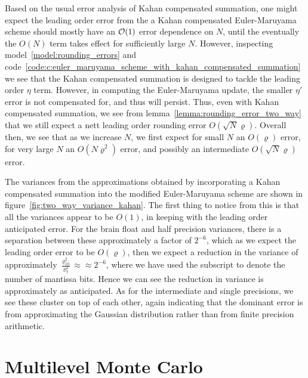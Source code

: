 \documentclass[manuscript,review]{acmart}
\begin{document}
Based on the usual error analysis of Kahan compensated summation, one might expect the leading order error from the a Kahan compensated Euler-Maruyama scheme should mostly have an $ \order{1} $ error dependence on $ N $, until the eventually the $ O(N) $ term takes effect for sufficiently large $ N $. However, inspecting model~\ref{model:rounding_errors} and code~\ref{code:c:euler_maruyama_scheme_with_kahan_compensated_summation} we see that the Kahan compensated summation is designed to tackle the leading order $ \eta $ term. However, in computing the Euler-Maruyama update, the smaller $ \eta' $ error is not compensated for, and thus will persist. Thus, even with Kahan compensated summation, we see from lemma~\ref{lemma:rounding_error_two_way} that we still expect a nett leading order rounding error $ O(\sqrt{N}\varrho) $. Overall then, we see that as we increase $ N $, we first expect for small $ N $ an $ O(\varrho) $ error, for very large $ N $ an $ O(N\varrho^2) $ error, and possibly an intermediate $ O(\sqrt{N}\varrho) $ error. 

The variances from the approximations obtained by incorporating a Kahan compensated summation into the modified Euler-Maruyama scheme are shown in figure~\ref{fig:two_way_variance_kahan}. The first thing to notice from this is that all the variances appear to be $ O(1) $, in keeping with the leading order anticipated error. For the brain float and half precision variances, there is a separation between these approximately a factor of $ 2^{-6} $, which as we expect the leading order error to be $ O(\varrho) $, then we expect a reduction in the variance of approximately $ \tfrac{\varrho^2_{10}}{\varrho^2_{7}} \approx \approx 2^{-6} $, where we have used the subscript to denote the number of mantissa bits. Hence we can see the reduction in variance is approximately as anticipated. As for the intermediate and single precisions, we see these cluster on top of each other, again indicating that the dominant error is from approximating the Gaussian distribution rather than from finite precision arithmetic. 

\section{Multilevel Monte Carlo}
\label{sec:multilevel_monte_carlo}
\end{document}
